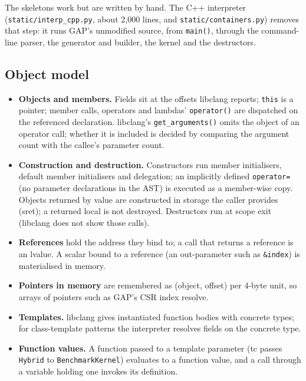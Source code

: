 \documentclass[11pt]{article}
\newcommand{\code}[1]{\texttt{#1}}
\begin{document}
The skeletons work but are written by hand. The C++ interpreter (\code{static/interp\_cpp.py}, about 2{,}000 lines,
and \code{static/containers.py}) removes that step: it runs GAP's unmodified source, from \code{main()}, through
the command-line parser, the generator and builder, the kernel and the destructors.

\subsection{Object model}
\begin{itemize}
\item \textbf{Objects and members.} Fields sit at the offsets libclang reports; \code{this} is a pointer; member
calls, operators and lambdas' \code{operator()} are dispatched on the referenced declaration. libclang's
\code{get\_arguments()} omits the object of an operator call; whether it is included is decided by comparing the
argument count with the callee's parameter count.
\item \textbf{Construction and destruction.} Constructors run member initialisers, default member initialisers and
delegation; an implicitly defined \code{operator=} (no parameter declarations in the AST) is executed as a
member-wise copy. Objects returned by value are constructed in storage the caller provides (sret); a returned local
is not destroyed. Destructors run at scope exit (libclang does not show those calls).
\item \textbf{References} hold the address they bind to; a call that returns a reference is an lvalue. A scalar bound
to a reference (an out-parameter such as \code{\&index}) is materialised in memory.
\item \textbf{Pointers in memory} are remembered as (object, offset) per 4-byte unit, so arrays of pointers such as
GAP's CSR index resolve.
\item \textbf{Templates.} libclang gives instantiated function bodies with concrete types; for class-template
patterns the interpreter resolves fields on the concrete type.
\item \textbf{Function values.} A function passed to a template parameter (tc passes \code{Hybrid} to
\code{BenchmarkKernel}) evaluates to a function value, and a call through a variable holding one invokes its
definition.
\end{itemize}
\end{document}
